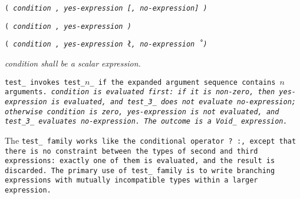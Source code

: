 
\s\s\s\tt{(} \it{condition} \tt{,} \it{yes-expression}
[\tt{,} \it{no-expression}] \tt{)}

\s\tt{(} \it{condition} \tt{,} \it{yes-expression} \tt{)}

\s\tt{(} \it{condition} \tt{,} \it{yes-expression}
\l\tt{,} \it{no-expression}\r\ \tt{)}


\it{condition} shall be a scalar expression.


\tt{test_} invokes \tt{test_}$n$\_ if the
expanded argument sequence contains $n$ arguments.
\it{condition} is evaluated first: if it is non-zero,
then \it{yes-expression} is evaluated,
and \tt{test_3_} does not evaluate \it{no-expression};
otherwise \it{condition} is zero, \it{yes-expression}
is not evaluated, and \tt{test_3_} evaluates \it{no-expression}.
The outcome is a \tt{Void_} expression.

\note The \tt{test_} family works like the conditional operator \tt{? :}, except
that there is no constraint between the types of second and third expressions:
exactly one of them is evaluated, and the result is discarded.
The primary use of \tt{test_} family is to write branching expressions
with mutually incompatible types within a larger expression.
